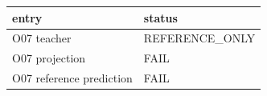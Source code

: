 \begin{tabular}{ll}
entry & status \\
\hline
O07 teacher & REFERENCE_ONLY \\
O07 projection & FAIL \\
O07 reference prediction & FAIL \\
\end{tabular}
